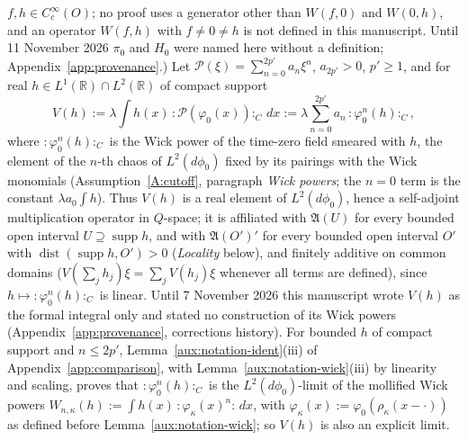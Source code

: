 \documentclass[11pt,a4paper]{article}
\theoremstyle{plain}
\theoremstyle{definition}
\theoremstyle{plain}
\theoremstyle{definition}
\newcommand{\R}{\mathbb{R}}
\newcommand{\A}{\mathfrak{A}}
\DeclareMathOperator{\supp}{supp}
\DeclareMathOperator{\dist}{dist}
\begin{document}
$f,h\in C_c^\infty(O)$; no proof uses a generator other than $W(f,0)$ and $W(0,h)$, and an
operator $W(f,h)$ with $f\ne0\ne h$ is not defined in this manuscript.  Until 11 November
2026 $\pi_0$ and $H_0$ were named here without a definition; Appendix~\ref{app:provenance}.)
Let
$\mathscr P(\xi)=\sum_{n=0}^{2p'}a_n\xi^n$, $a_{2p'}>0$, $p'\ge1$, and for real
$h\in L^1(\R)\cap L^2(\R)$ of compact support
\[
  V(h):=\lambda\int h(x)\,{:}\mathscr P(\varphi_0(x)){:}_C\,dx
  :=\lambda\sum_{n=0}^{2p'}a_n\,{:}\varphi_0^n(h){:}_C ,
\]
where ${:}\varphi_0^n(h){:}_C$ is the Wick power of the time-zero field smeared with $h$,
the element of the $n$-th chaos of $L^2(d\phi_0)$ fixed by its pairings with the Wick
monomials (Assumption~\ref{A:cutoff}, paragraph \emph{Wick powers}; the $n=0$ term is the
constant $\lambda a_0\int h$).  Thus $V(h)$ is a real element of $L^2(d\phi_0)$, hence
a self-adjoint multiplication operator in $Q$-space; it is affiliated with $\A(U)$ for every bounded
open interval $U\supseteq\supp h$, and with $\A(O')'$ for every bounded open interval $O'$ with
$\dist(\supp h,O')>0$ (\emph{Locality} below), and finitely additive on common domains
($V(\sum_j h_j)\xi=\sum_j V(h_j)\xi$ whenever all terms are defined), since
$h\mapsto{:}\varphi_0^n(h){:}_C$ is linear.  Until 7 November 2026 this
manuscript wrote $V(h)$ as the formal integral only and stated no construction of its Wick
powers (Appendix~\ref{app:provenance}, corrections history).  For bounded $h$ of compact
support and $n\le2p'$, Lemma~\ref{aux:notation-ident}(iii) of Appendix~\ref{app:comparison},
with Lemma~\ref{aux:notation-wick}(iii) by linearity and scaling, proves that
${:}\varphi_0^n(h){:}_C$ is the $L^2(d\phi_0)$-limit of the mollified Wick powers
$W_{n,\kappa}(h):=\int h(x)\,{:}\varphi_\kappa(x)^n{:}\,dx$, with
$\varphi_\kappa(x):=\varphi_0(\rho_\kappa(x-\cdot))$ as defined before
Lemma~\ref{aux:notation-wick}; so $V(h)$ is also an explicit limit.
\end{document}
